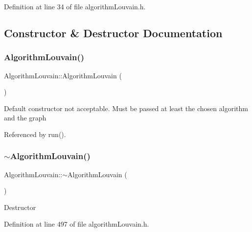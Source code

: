 Definition at line 34 of file algorithm\+Louvain.\+h.



\subsection{Constructor \& Destructor Documentation}
\mbox{\label{classAlgorithmLouvain_ada8cb9a0c018ca6d5162b1b533ad400c}} 
\subsubsection{\texorpdfstring{Algorithm\+Louvain()}{AlgorithmLouvain()}\hspace{0.1cm}{\footnotesize\ttfamily [1/2]}}
{\footnotesize\ttfamily Algorithm\+Louvain\+::\+Algorithm\+Louvain (\begin{DoxyParamCaption}{ }\end{DoxyParamCaption})\hspace{0.3cm}{\ttfamily [delete]}}

Default constructor not acceptable. Must be passed at least the chosen algorithm and the graph 

Referenced by run().

\mbox{\label{classAlgorithmLouvain_af39d19eff13dc68f4f5ef3a113c361e1}} 
\subsubsection{\texorpdfstring{$\sim$\+Algorithm\+Louvain()}{~AlgorithmLouvain()}}
{\footnotesize\ttfamily Algorithm\+Louvain\+::$\sim$\+Algorithm\+Louvain (\begin{DoxyParamCaption}{ }\end{DoxyParamCaption})\hspace{0.3cm}{\ttfamily [inline]}}

Destructor 

Definition at line 497 of file algorithm\+Louvain.\+h.

\mbox{\label{classAlgorithmLouvain_a44cd235ecff85b3896fe5d30e0b5da9a}} 
